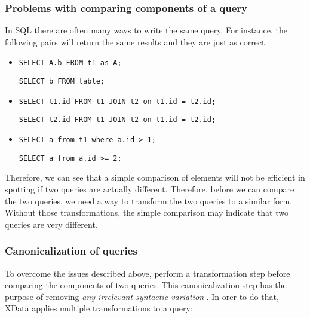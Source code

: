 \subsubsection{Problems with comparing components of a query}

In SQL there are often many ways to write the same query.
For instance, the following pairs will return the same results and they are
just as correct.

\begin{itemize}
  \item \texttt{SELECT A.b FROM t1 as A;}

  \texttt{SELECT b FROM table;}
  \item \texttt{SELECT t1.id FROM t1 JOIN t2 on t1.id = t2.id;}

  \texttt{SELECT t2.id FROM t1 JOIN t2 on t1.id = t2.id;}
  \item \texttt{SELECT a from t1 where a.id > 1;}

  \texttt{SELECT a from a.id >= 2;}
\end{itemize}

Therefore, we can see that a simple comparison of elements will not be efficient in spotting if two queries are actually different. Therefore, before we can compare the two queries, we need a way to transform the two queries to a similar form. Without those transformations, the simple comparison may indicate
that two queries are very different.

\subsubsection{Canonicalization of queries} \label{ch:lit:sec:canonicalization}

To overcome the issues described above, \cite{literature:xdata} perform a transformation step before comparing the components of two queries. This canonicalization step has the purpose of removing \textit{any irrelevant syntactic variation} \citep{literature:xdata}. In orer to do that, XData applies multiple transformations to a query:


